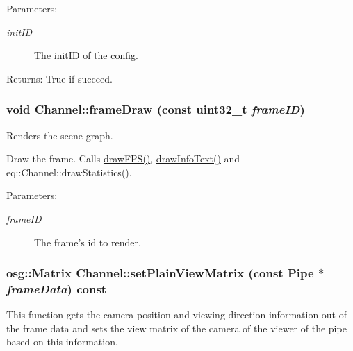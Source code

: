 \begin{Desc}
\item[Parameters:]
\begin{description}
\item[{\em initID}]The initID of the config. \end{description}
\end{Desc}
\begin{Desc}
\item[Returns:]True if succeed. \end{Desc}
\hypertarget{a00002_70cfd22742da9b9aa3e3478f356ba220}{
\subsubsection[{frameDraw}]{\setlength{\rightskip}{0pt plus 5cm}void Channel::frameDraw (const uint32\_\-t {\em frameID})}}
\label{a00002_70cfd22742da9b9aa3e3478f356ba220}


Renders the scene graph. 

Draw the frame. Calls \hyperlink{a00002_2950f8b33948b9f8fea20910b95fc695}{drawFPS()}, \hyperlink{a00002_e0efffd06ae7a755b7f0c80641d5e6d7}{drawInfoText()} and eq::Channel::drawStatistics(). \begin{Desc}
\item[Parameters:]
\begin{description}
\item[{\em frameID}]The frame's id to render. \end{description}
\end{Desc}
\hypertarget{a00002_d3a369c393e8065327ef37cef65e25c7}{
\subsubsection[{setPlainViewMatrix}]{\setlength{\rightskip}{0pt plus 5cm}osg::Matrix Channel::setPlainViewMatrix (const {\bf Pipe} $\ast$ {\em frameData}) const}}
\label{a00002_d3a369c393e8065327ef37cef65e25c7}


This function gets the camera position and viewing direction information out of the frame data and sets the view matrix of the camera of the viewer of the pipe based on this information. 

